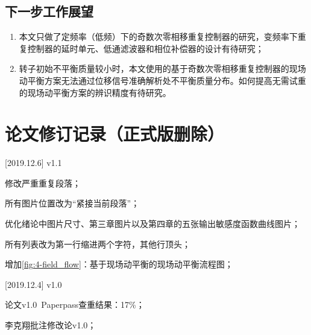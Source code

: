 \documentclass[
  lang=cn,
  degree=master,
  openany,oneside
]{nuaathesis}
\begin{document}
\section{下一步工作展望}
\begin{enumerate}
	\item 本文只做了定频率（低频）下的奇数次零相移重复控制器的研究，变频率下重复控制器的延时单元、低通滤波器和相位补偿器的设计有待研究；
	\item 转子初始不平衡质量较小时，本文使用的基于奇数次零相移重复控制器的现场动平衡方案无法通过位移信号准确解析处不平衡质量分布。如何提高无需试重的现场动平衡方案的辨识精度有待研究。
\end{enumerate}

%
%
%
%

\appendix
%

\backmatter
%




\chapter{论文修订记录（正式版删除）}

[2019.12.6] v1.1 

修改严重重复段落；

所有图片位置改为“紧接当前段落”；

优化绪论中图片尺寸、第三章图片以及第四章的五张输出敏感度函数曲线图片；

所有列表改为第一行缩进两个字符，其他行顶头；

增加\autoref{fig:4-field_flow}：基于现场动平衡的现场动平衡流程图；


[2019.12.4] v1.0 

论文v1.0~Paperpass查重结果：17\%； 

李克翔批注修改论v1.0；
\end{document}
